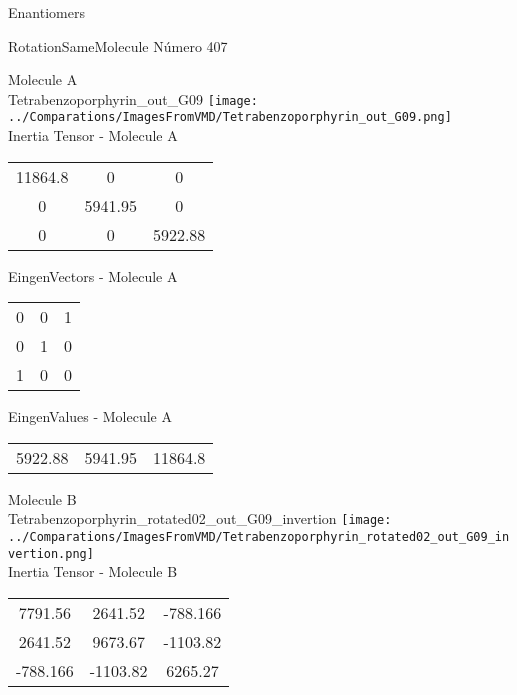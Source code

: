 \begin{center}
\vtab
\vtab
\textcolor{NavyBlue}{\Large Enantiomers}
\end{center}

 \newpage

\vtab[-2cm]
\begin{center}
{\large RotationSameMolecule \tab Número 407}
\end{center}
\begin{multicols}{2}
\begin{center}

Molecule A \\ 
Tetrabenzoporphyrin\_out\_G09
\texttt{[image: ../Comparations/ImagesFromVMD/Tetrabenzoporphyrin\_out\_G09.png]}
\\
Inertia Tensor - Molecule A \\
\vtab

\begin{tabular}{|c c c|}
11864.8	 & 	0	 & 	0	 \\
0	 & 	5941.95	 & 	0	 \\
0	 & 	0	 & 	5922.88
\end{tabular}

\vtab
 EingenVectors - Molecule A     \\
\vtab
\begin{tabular}{|c c c|}
0	 & 	0	 & 	1	 \\
0	 & 	1	 & 	0	 \\
1	 & 	0	 & 	0
\end{tabular}

\vtab
 EingenValues - Molecule A     \\
\vtab
\begin{tabular}{|c c c|}
5922.88	 & 	5941.95	 & 	11864.8	 \\
\end{tabular}
\columnbreak

Molecule B \\ 
Tetrabenzoporphyrin\_rotated02\_out\_G09\_invertion
\texttt{[image: ../Comparations/ImagesFromVMD/Tetrabenzoporphyrin\_rotated02\_out\_G09\_invertion.png]}
\\
Inertia Tensor - Molecule B \\
\vtab

\begin{tabular}{|c c c|}
7791.56	 & 	2641.52	 & 	-788.166	 \\
2641.52	 & 	9673.67	 & 	-1103.82	 \\
-788.166	 & 	-1103.82	 & 	6265.27
\end{tabular}


\end{center}
\end{multicols}
